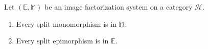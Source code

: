 Let $(\mathbb{E}, \mathbb{M})$ be an image factorization system on a category $\mathcal{H}$.

\begin{enumerate}
  \item Every split monomorphism is in $\mathbb{M}$.
  \item Every split epimorphism is in $\mathbb{E}$.
\end{enumerate}
